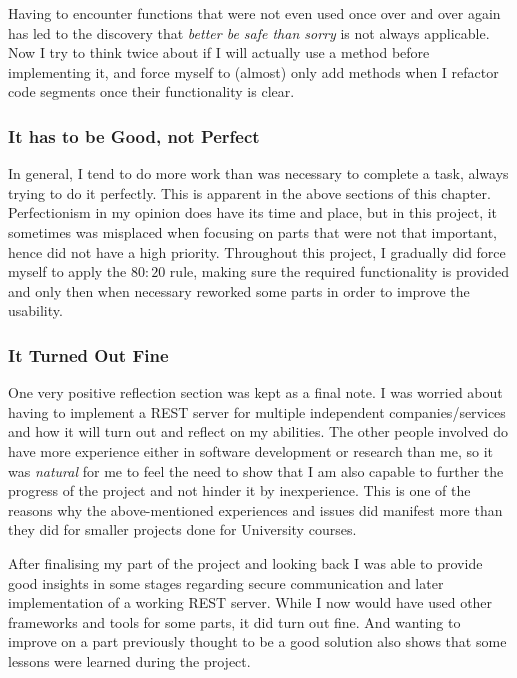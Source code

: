             Having to encounter functions that were not even used once over and over again has led to the discovery that \emph{better be safe than sorry} is not always applicable.
            Now I try to think twice about if I will actually use a method before implementing it, and force myself to (almost) only add methods when I refactor code segments once their functionality is clear.

        \subsubsection{It has to be Good, not Perfect}
            
            In general, I tend to do more work than was necessary to complete a task, always trying to do it perfectly.
            This is apparent in the above sections of this chapter.
            Perfectionism in my opinion does have its time and place, but in this project, it sometimes was misplaced when focusing on parts that were not that important, hence did not have a high priority.
            Throughout this project, I gradually did force myself to apply the $80:20$ rule, making sure the required functionality is provided and only then when necessary reworked some parts in order to improve the usability.

        \subsubsection{It Turned Out Fine}

            One very positive reflection section was kept as a final note.
            I was worried about having to implement a REST server for multiple independent companies/services and how it will turn out and reflect on my abilities. 
            The other people involved do have more experience either in software development or research than me, so it was \emph{natural} for me to feel the need to show that I am also capable to further the progress of the project and not hinder it by inexperience.
            This is one of the reasons why the above-mentioned experiences and issues did manifest more than they did for smaller projects done for University courses.

            After finalising my part of the project and looking back I was able to provide good insights in some stages regarding secure communication and later implementation of a working REST server. 
            While I now would have used other frameworks and tools for some parts, it did turn out fine.
            And wanting to improve on a part previously thought to be a good solution also shows that some lessons were learned during the project.

